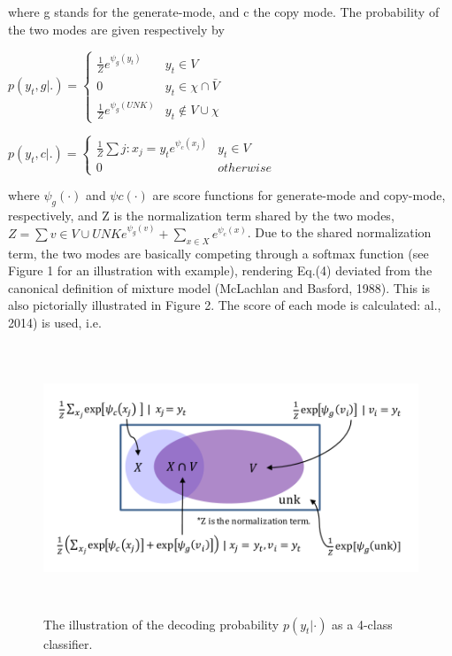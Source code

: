 \documentclass[UTF8]{ctexart}
\begin{document}
    where g stands for the generate-mode, and c the
    copy mode. The probability of the two modes are
    given respectively by


    $   p(y_t,g|.)=\left\{
        \begin{matrix}
        \frac{1}{Z}e^{ \psi_g (y_t)}& y_t \in  V\\
        0 & y_t \in \chi \cap \bar{V}\\
        \frac{1}{Z}e^{ \psi_g (UNK)} & y_t \not \in V \cup \chi
        \end{matrix}
        \right.                                   $

        $  p(y_t,c|.)=\left\{
            \begin{matrix}
            \frac{1}{Z}\sum{j:x_j=y_t}e^{ \psi_c (x_j)}& y_t \in  V\\
            0 & otherwise
            \end{matrix}
            \right.                                   $
    
    where $\psi_g(·)$ and $\psi c(·)$ are score functions for
    generate-mode and copy-mode, respectively, and
    Z is the normalization term shared by the two
    modes, $Z = \sum{v \in V \cup {UNK}} e^{\psi_g(v)}  +\sum_{x \in X} e^{\psi_c(x)} $.
    Due to the shared normalization term, the two
    modes are basically competing through a softmax
    function (see Figure 1 for an illustration with example), rendering Eq.(4) deviated from the canonical definition of mixture model (McLachlan and
    Basford, 1988). This is also pictorially illustrated
    in Figure 2. The score of each mode is calculated:
    al., 2014) is used, i.e.

    \begin{figure}[htbp]
        \centering
        \vspace{-0.35cm} 
        \includegraphics[width=14cm,height=8cm]{pictures/x.jpg}
        \caption{The illustration of the decoding probability $p(y_t|·)$ as a 4-class classifier.}
    \end{figure}
\end{document}
